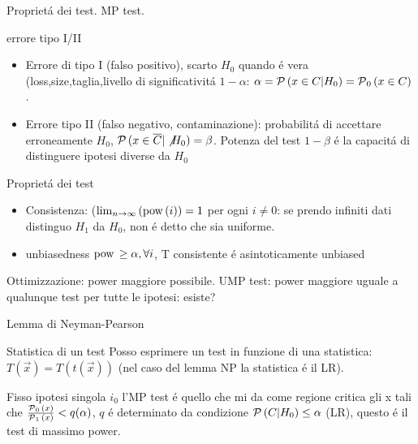 \begin{frame}{Propriet\'a dei test. MP test.}
\begin{block}{errore tipo I/II}
	\begin{itemize}
		\item Errore di tipo I (falso positivo), scarto $H_0$ quando \'e vera (loss,size,taglia,livello di significativit\'a $1-\alpha$: $\alpha=\operatorname{\mathcal{P}}{(x\in C|H_0)}=\operatorname{\mathcal{P}}_0{(x\in C)}$.
		\item Errore tipo II (falso negativo, contaminazione): probabilit\'a di accettare erroneamente $H_0$, $\operatorname{\mathcal{P}}{(x\in\overline{C}|\not{H_0})}=\beta$. Potenza del test $1-\beta$ \'e la capacit\'a di distinguere ipotesi diverse da $H_0$ 
	\end{itemize}
\end{block}

\begin{block}{Propriet\'a dei test}
	\begin{itemize}
		\item Consistenza: ($\lim_{n\to\infty}{(\operatorname{pow}{(i)})}=1$ per ogni $i\neq0$: se prendo infiniti dati distinguo $H_1$ da $H_0$, non \'e detto che sia uniforme.
		\item unbiasedness $\operatorname{pow}{}\geq\alpha, \forall i$, T consistente \'e asintoticamente unbiased
	\end{itemize}
\end{block}
 \begin{block}{Ottimizzazione: power maggiore possibile.}
UMP test: power maggiore uguale a qualunque test per tutte le ipotesi: esiste?
\end{block}
\end{frame}

\begin{frame}{Lemma di Neyman-Pearson}
\begin{block}{Statistica di un test}
Posso esprimere un test in funzione di una statistica: $T(\vec{x})=T(t(\vec{x}))$ (nel caso del lemma NP la statistica \'e il LR). 
\end{block}
Fisso ipotesi singola $i_0$ l'MP test \'e quello che mi da come regione critica gli x tali che $\frac{\operatorname{\mathcal{P}}_0{(x)}}{\operatorname{\mathcal{P}}_1{(x)}}<q(\alpha)$, $q$ \'e determinato da condizione $\operatorname{\mathcal{P}}{(C|H_0)}\leq\alpha$ (LR), questo \'e il test di massimo power.

\end{frame}

